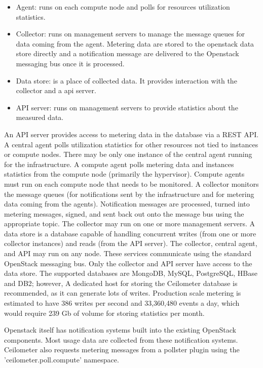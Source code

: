 \documentclass{sig-alternate}
\begin{document}
\begin{itemize}
  \item Agent: runs on each compute node and polls for resources utilization statistics.
  \item Collector: runs on management servers to manage the message queues for data coming from the agent. Metering data are stored to the openstack data store directly and a notification message are delivered to the Openstack messaging bus once it is processed.
  \item Data store: is a place of collected data. It provides interaction with the collector and a api server.
  \item API server: runs on management servers to provide statistics about the measured data.
\end{itemize}

An API server provides access to metering data in the database via a REST API. A central agent polls utilization statistics for other resources not tied to instances or compute nodes. There may be only one instance of the central agent running for the infrastructure. A compute agent polls metering data and instances statistics from the compute node (primarily the hypervisor). Compute agents must run on each compute node that needs to be monitored. A collector monitors the message queues (for notifications sent by the infrastructure and for metering data coming from the agents). Notification messages are processed, turned into metering messages, signed, and sent back out onto the message bus using the appropriate topic. The collector may run on one or more management servers. A data store is a database capable of handling concurrent writes (from one or more collector instances) and reads (from the API server). The collector, central agent, and API may run on any node. These services communicate using the standard OpenStack messaging bus. Only the collector and API server have access to the data store. The supported databases are MongoDB, MySQL, PostgreSQL, HBase and DB2; however, A dedicated host for storing the Ceilometer database is recommended, as it can generate lots of writes. Production scale metering is estimated to have 386 writes per second and 33,360,480 events a day, which would require 239 Gb of volume for storing statistics per month. ~\cite{Barcet12}

Openstack itself has notification systems built into the existing OpenStack components. Most usage data are collected from these notification systems. Ceilometer also requests metering messages from a pollster plugin using the 'ceilometer.poll.compute' namespace.
\end{document}
